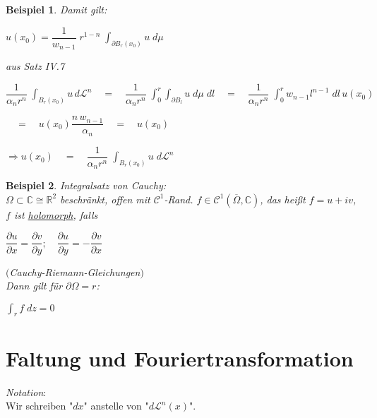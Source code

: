 \documentclass[11pt]{memoir}
\theoremstyle{changebreak}
\newtheorem{Beispiel}{Beispiel}[chapter]
\newcommand{\dom}{\partial\Omega}
\newcommand{\oo}{\overline{\Omega}}
\begin{document}
\begin{Beispiel}
\par\bigskip
Damit gilt:
\begin{center}
	$u(x_0) = \dfrac{1}{w_{n-1}}\; r^{1-n} \; \int_{\partial B_r(x_0)} u \; d\mu$
\end{center}

aus Satz IV.7
\par\bigskip
$\dfrac{1}{\alpha_n r^n} \; \int_{B_r(x_0)} u \, d\mathscr L^n 
\quad = \quad 
\dfrac{1}{\alpha_n r^n} \; \int_0^r \int_{\partial B_l} u \; d\mu \;dl
\quad = \quad 
\dfrac{1}{\alpha_n r^n} \; \int_0^r w_{n-1} l^{n-1} \; dl \, u(x_0)$
\par\bigskip
$\quad = \quad u(x_0) \dfrac{n \,w_{n-1}}{\alpha_n} 
\quad = \quad
u(x_0)$
\begin{center}
	$\Rightarrow u(x_0) \quad = \quad \dfrac{1}{\alpha_n r^n} \; \int_{B_r(x_0)} u \;d\mathscr L^n$
\end{center}

\end{Beispiel}

\begin{Beispiel}
\emph{Integralsatz von Cauchy}: \\
$\Omega \subset \mathbb C \cong \mathbb R^2$ beschränkt, offen mit $\mathscr C^1$-Rand.
$f \in \mathscr C^1(\oo, \mathbb C)$, das heißt $f = u + i v$, $f$ ist \underline{holomorph}, falls
\begin{center}
	$\dfrac{\partial u}{\partial x} = \dfrac{\partial v}{\partial y}; \quad \dfrac{\partial u}{\partial y} = - \dfrac{\partial v}{\partial x}$
\end{center}
$($Cauchy-Riemann-Gleichungen$)$ \\
Dann gilt für $\dom = r$:
\begin{center}
	$\int_r f\; dz = 0$
\end{center}
\end{Beispiel}





\chapter{Faltung und Fouriertransformation}

\emph{Notation}: \\
Wir schreiben "$dx$"\; anstelle von "$d\mathscr L^n(x)$".
\end{document}
